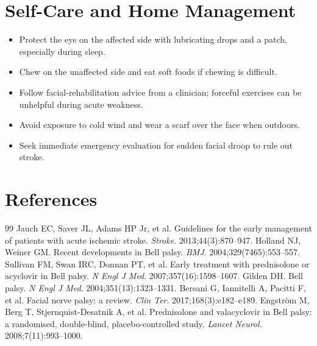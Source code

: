 \section*{Self-Care and Home Management}
\begin{itemize}
  \item Protect the eye on the affected side with lubricating drops and a patch, especially during sleep.
  \item Chew on the unaffected side and eat soft foods if chewing is difficult.
  \item Follow facial-rehabilitation advice from a clinician; forceful exercises can be unhelpful during acute weakness.
  \item Avoid exposure to cold wind and wear a scarf over the face when outdoors.
  \item Seek immediate emergency evaluation for sudden facial droop to rule out stroke.
\end{itemize}

\section*{References}
\begin{thebibliography}{99}
Jauch EC, Saver JL, Adams HP Jr, et al. Guidelines for the early management of patients with acute ischemic stroke. \textit{Stroke}. 2013;44(3):870--947.
Holland NJ, Weiner GM. Recent developments in Bell palsy. \textit{BMJ}. 2004;329(7465):553--557.
Sullivan FM, Swan IRC, Donnan PT, et al. Early treatment with prednisolone or acyclovir in Bell palsy. \textit{N Engl J Med}. 2007;357(16):1598--1607.
Gilden DH. Bell palsy. \textit{N Engl J Med}. 2004;351(13):1323--1331.
Bersani G, Iannitelli A, Pacitti F, et al. Facial nerve palsy: a review. \textit{Clin Ter}. 2017;168(3):e182--e189.
Engstr\"{o}m M, Berg T, Stjernquist-Desatnik A, et al. Prednisolone and valacyclovir in Bell palsy: a randomised, double-blind, placebo-controlled study. \textit{Lancet Neurol}. 2008;7(11):993--1000.
\end{thebibliography}
